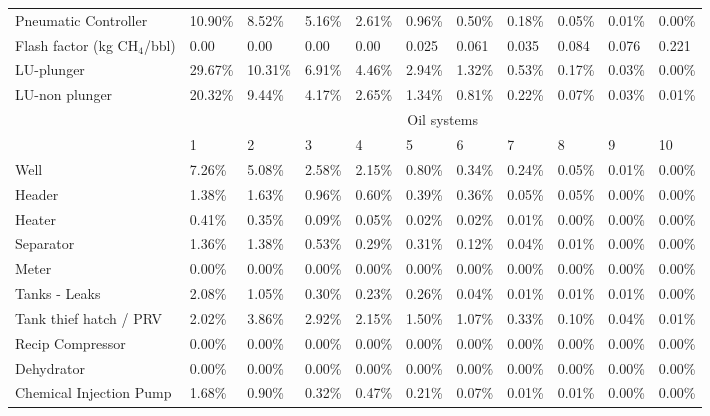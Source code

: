 \documentclass[11pt]{report}
\begin{document}
\begin{landscape}
\begin{table}
\begin{scriptsize}
\begin{threeparttable}
\begin{tabular}{lllllllllll}
Pneumatic Controller    & 10.90\% & 8.52\%  & 5.16\%  & 2.61\% & 0.96\% & 0.50\% & 0.18\% & 0.05\% & 0.01\% & 0.00\%  \\
Flash factor (kg CH$_4$/bbl)           & 0.00  & 0.00  & 0.00  & 0.00 & 0.025 & 0.061 & 0.035 & 0.084 & 0.076 & 0.221 \\
LU-plunger              & 29.67\% & 10.31\% & 6.91\%  & 4.46\% & 2.94\% & 1.32\% & 0.53\% & 0.17\% & 0.03\% & 0.00\%  \\
LU-non plunger          & 20.32\% & 9.44\%  & 4.17\%  & 2.65\% & 1.34\% & 0.81\% & 0.22\% & 0.07\% & 0.03\% & 0.01\% \\
\midrule
                        & \multicolumn{10}{c}{Oil systems}                                                               \\
                        \midrule
                        & 1       & 2       & 3       & 4       & 5       & 6       & 7       & 8       & 9       & 10      \\
Well                    & 7.26\%  & 5.08\%  & 2.58\%  & 2.15\%  & 0.80\%  & 0.34\%  & 0.24\%  & 0.05\%  & 0.01\%  & 0.00\%  \\
Header                  & 1.38\%  & 1.63\%  & 0.96\%  & 0.60\%  & 0.39\%  & 0.36\%  & 0.05\%  & 0.05\%  & 0.00\%  & 0.00\%  \\
Heater                  & 0.41\%  & 0.35\%  & 0.09\%  & 0.05\%  & 0.02\%  & 0.02\%  & 0.01\%  & 0.00\%  & 0.00\%  & 0.00\%  \\
Separator               & 1.36\%  & 1.38\%  & 0.53\%  & 0.29\%  & 0.31\%  & 0.12\%  & 0.04\%  & 0.01\%  & 0.00\%  & 0.00\%  \\
Meter                   & 0.00\%  & 0.00\%  & 0.00\%  & 0.00\%  & 0.00\%  & 0.00\%  & 0.00\%  & 0.00\%  & 0.00\%  & 0.00\%  \\
Tanks - Leaks           & 2.08\%  & 1.05\%  & 0.30\%  & 0.23\%  & 0.26\%  & 0.04\%  & 0.01\%  & 0.01\%  & 0.01\%  & 0.00\%  \\
Tank thief hatch / PRV  & 2.02\%  & 3.86\%  & 2.92\%  & 2.15\%  & 1.50\%  & 1.07\%  & 0.33\%  & 0.10\%  & 0.04\%  & 0.01\%  \\
Recip Compressor        & 0.00\%  & 0.00\%  & 0.00\%  & 0.00\%  & 0.00\%  & 0.00\%  & 0.00\%  & 0.00\%  & 0.00\%  & 0.00\%  \\
Dehydrator              & 0.00\%  & 0.00\%  & 0.00\%  & 0.00\%  & 0.00\%  & 0.00\%  & 0.00\%  & 0.00\%  & 0.00\%  & 0.00\%  \\
Chemical Injection Pump & 1.68\%  & 0.90\%  & 0.32\%  & 0.47\%  & 0.21\%  & 0.07\%  & 0.01\%  & 0.01\%  & 0.00\%  & 0.00\%  \\

\end{tabular}
\end{threeparttable}
\end{scriptsize}
\end{table}
\end{landscape}
\end{document}
